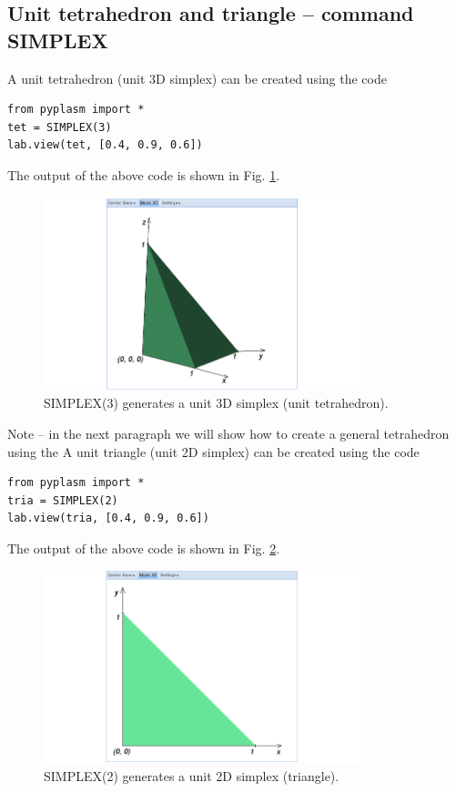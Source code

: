 \documentclass[article,A4,12pt]{llncs}
\begin{document}
\subsection{Unit tetrahedron and triangle -- command SIMPLEX}

A unit tetrahedron (unit 3D simplex) can be created using the code
\begin{verbatim}
from pyplasm import *
tet = SIMPLEX(3)
lab.view(tet, [0.4, 0.9, 0.6])
\end{verbatim}
The output of the above code is shown in Fig. \ref{fig:simplex-1}.

\newpage

\begin{figure}[!ht]
\begin{center}
\includegraphics[width=0.82\textwidth]{img/simplex-1.png}
\end{center}
\vspace{-2mm}
\caption{SIMPLEX(3) generates a unit 3D simplex (unit tetrahedron).}
\label{fig:simplex-1}
\end{figure}
\noindent
Note -- in the next paragraph we will show how to create a general 
tetrahedron using the 
A unit triangle (unit 2D simplex) can be created using the code
\begin{verbatim}
from pyplasm import *
tria = SIMPLEX(2)
lab.view(tria, [0.4, 0.9, 0.6])
\end{verbatim}
The output of the above code is shown in Fig. \ref{fig:simplex-2}.
\newpage

\begin{figure}[!ht]
\begin{center}
\includegraphics[width=0.82\textwidth]{img/simplex-2.png}
\end{center}
\vspace{-2mm}
\caption{SIMPLEX(2) generates a unit 2D simplex (triangle).}
\label{fig:simplex-2}
\vspace{-1cm}
\end{figure}
\end{document}
